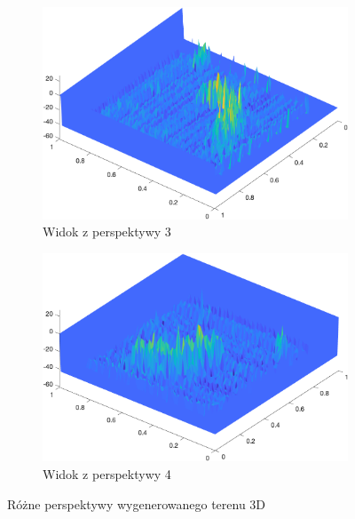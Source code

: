 \documentclass{article}
\begin{document}
\begin{figure}[H]
\begin{subfigure}[b]{0.45\textwidth}
        \includegraphics[width=\textwidth]{3D_3.png}
        \caption{Widok z perspektywy 3}
    \end{subfigure}
    \begin{subfigure}[b]{0.45\textwidth}
        \includegraphics[width=\textwidth]{3D_4.png}
        \caption{Widok z perspektywy 4}
    \end{subfigure}
    \caption{Różne perspektywy wygenerowanego terenu 3D}
    \label{fig:3d-views}
\end{figure}
\end{document}
